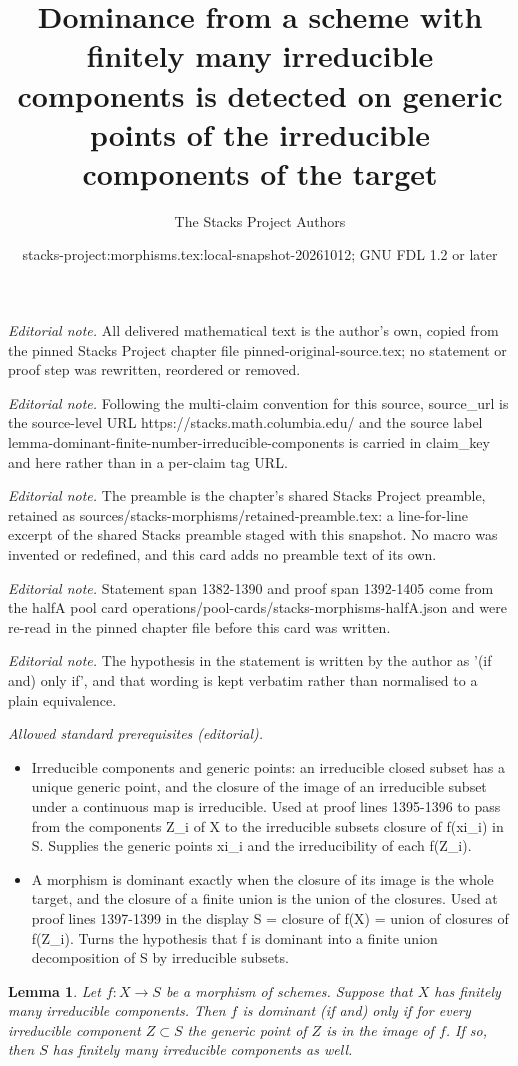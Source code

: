 \documentclass[10pt,a4paper]{amsart}
\title{Dominance from a scheme with finitely many irreducible components is detected on generic points of the irreducible components of the target}
\author{The Stacks Project Authors}
\date{stacks-project:morphisms.tex:local-snapshot-20261012; GNU FDL 1.2 or later}
\theoremstyle{plain}
\newtheorem{lemma}[subsection]{Lemma}
\theoremstyle{definition}
\theoremstyle{remark}
\numberwithin{equation}{subsection}
\begin{document}
\maketitle
\noindent\textit{Editorial note.} All delivered mathematical text is the author's own, copied from the pinned Stacks Project chapter file pinned-original-source.tex; no statement or proof step was rewritten, reordered or removed.\par\medskip
\noindent\textit{Editorial note.} Following the multi-claim convention for this source, source\_url is the source-level URL https://stacks.math.columbia.edu/ and the source label lemma-dominant-finite-number-irreducible-components is carried in claim\_key and here rather than in a per-claim tag URL.\par\medskip
\noindent\textit{Editorial note.} The preamble is the chapter's shared Stacks Project preamble, retained as sources/stacks-morphisms/retained-preamble.tex: a line-for-line excerpt of the shared Stacks preamble staged with this snapshot. No macro was invented or redefined, and this card adds no preamble text of its own.\par\medskip
\noindent\textit{Editorial note.} Statement span 1382-1390 and proof span 1392-1405 come from the halfA pool card operations/pool-cards/stacks-morphisms-halfA.json and were re-read in the pinned chapter file before this card was written.\par\medskip
\noindent\textit{Editorial note.} The hypothesis in the statement is written by the author as '(if and) only if', and that wording is kept verbatim rather than normalised to a plain equivalence.\par\medskip
\noindent\textit{Allowed standard prerequisites (editorial).}\begin{itemize}
\item Irreducible components and generic points: an irreducible closed subset has a unique generic point, and the closure of the image of an irreducible subset under a continuous map is irreducible. Used at proof lines 1395-1396 to pass from the components Z\_i of X to the irreducible subsets closure of f(xi\_i) in S. Supplies the generic points xi\_i and the irreducibility of each f(Z\_i).
\item A morphism is dominant exactly when the closure of its image is the whole target, and the closure of a finite union is the union of the closures. Used at proof lines 1397-1399 in the display S = closure of f(X) = union of closures of f(Z\_i). Turns the hypothesis that f is dominant into a finite union decomposition of S by irreducible subsets.
\end{itemize}\medskip
\begin{lemma}
\label{lemma-dominant-finite-number-irreducible-components}
Let $f : X \to S$ be a morphism of schemes.
Suppose that $X$ has finitely many irreducible components.
Then $f$ is dominant (if and) only if for every irreducible
component $Z \subset S$ the generic point of $Z$ is in the
image of $f$. If so, then $S$ has finitely many irreducible
components as well.
\end{lemma}
\end{document}
